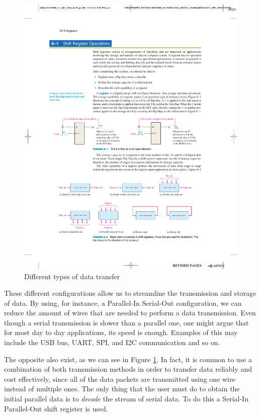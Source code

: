 \begin{figure}[H]
    \centering
    \includegraphics[scale = 0.85]{Graphics/VHDL/Practice 5/SHIFT_REGISTER_BASICS/DATA_TRANSMISSION/Data_Movement_451.pdf}
    \caption{Different types of data transfer ~\autocite{FLOYD}}
    \label{fig:DATA_TRANSFER}
\end{figure}

These different configurations allow us to streamline the transmission and storage of data. By using, for instance, a Parallel-In Serial-Out configuration, we can reduce the amount of wires that are needed to perform a data transmission. Even though a serial transmission is slower than a parallel one, one might argue that for most day to day applications, its speed is enough. Examples of this may include the USB bus, UART, SPI, and I2C communication and so on.\medskip

The opposite also exist, as we can see in Figure \ref{fig:DATA_TRANSFER}. In fact, it is common to use a combination of both transmission methods in order to transfer data reliably and cost effectively, since all of the data packets are transmitted using one wire instead of multiple ones. The only thing that the user must do to obtain the initial parallel data is to \textit{decode} the stream of serial data. To do this a Serial-In Parallel-Out shift register is used. \medskip

